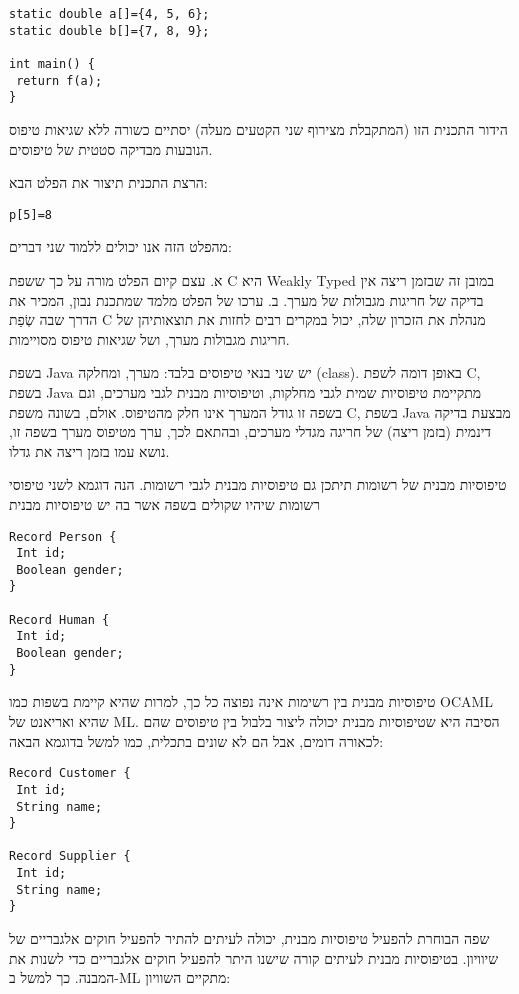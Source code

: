 \begin{verbatim}
static double a[]={4, 5, 6};
static double b[]={7, 8, 9};

int main() {
 return f(a);
}
\end{verbatim}

      הידור התכנית הזו (המתקבלת מצירוף שני הקטעים מעלה) יסתיים כשורה ללא שגיאות טיפוס הנובעות מבדיקה סטטית של טיפוסים.

      הרצת התכנית תיצור את הפלט הבא:

\begin{verbatim}
p[5]=8
\end{verbatim}

      מהפלט הזה אנו יכולים ללמוד שני דברים:

      א. עצם קיום הפלט מורה על כך ששפת C היא Weakly Typed במובן זה שבזמן ריצה אין בדיקה של חריגות מגבולות של מערך.
      ב. ערכו של הפלט מלמד שמתכנת נבון, המכיר את הדרך שבה שְׂפַת C מנהלת את הזכרון שלה, יכול במקרים רבים לחזות את תוצאותיהן של חריגות מגבולות מערך, ושל שגיאות טיפוס מסויימות.

      בשפת Java יש שני בנאי טיפוסים בלבד: מערך, ומחלקה (class). באופן דומה לשפת C, בשפת Java מתקיימת טיפוסיות שמית לגבי מחלקות, וטיפוסיות מבנית לגבי מערכים, וגם בשפה זו גודל המערך אינו חלק מהטיפוס. אולם, בשונה משפת C, בשפת Java מבצעת בדיקה דינמית (בזמן ריצה) של חריגה מגדלי מערכים, ובהתאם לכך, ערך מטיפוס מערך בשפה זו, נושא עמו בזמן ריצה את גדלו.

      טיפוסיות מבנית של רשומות
      תיתכן גם טיפוסיות מבנית לגבי רשומות. הנה דוגמא לשני טיפוסי רשומות שיהיו שקולים בשפה אשר בה יש טיפוסיות מבנית

\begin{verbatim}
Record Person {
 Int id;
 Boolean gender;
}

Record Human {
 Int id;
 Boolean gender;
}
\end{verbatim}

      טיפוסיות מבנית בין רשימות אינה נפוצה כל כך, למרות שהיא קיימת בשפות כמו OCAML שהיא ואריאנט של ML. הסיבה היא שטיפוסיות מבנית יכולה ליצור בלבול בין טיפוסים שהם לכאורה דומים, אבל הם לא שונים בתכלית, כמו למשל בדוגמא הבאה:

\begin{verbatim}
Record Customer {
 Int id;
 String name;
}

Record Supplier {
 Int id;
 String name;
}
\end{verbatim}

      שפה הבוחרת להפעיל טיפוסיות מבנית, יכולה לעיתים להתיר להפעיל חוקים אלגבריים של שיוויון. בטיפוסיות מבנית לעיתים קורה שישנו היתר להפעיל חוקים אלגבריים כדי לשנות את המבנה. כך למשל ב-ML מתקיים השוויון:

